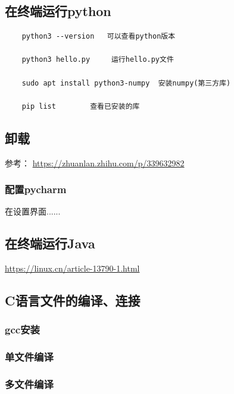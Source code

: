\documentclass[12pt]{article}
\begin{document}
\newpage
\subsection{在终端运行python}

\begin{verbatim}
    python3 --version   可以查看python版本

    python3 hello.py     运行hello.py文件

    sudo apt install python3-numpy  安装numpy(第三方库)

    pip list        查看已安装的库
\end{verbatim}


\subsection{卸载}

参考：
\href{https://zhuanlan.zhihu.com/p/339632982}{https://zhuanlan.zhihu.com/p/339632982}

\subsubsection{配置pycharm}

在设置界面......

\subsection{在终端运行Java}

\href{https://linux.cn/article-13790-1.html}{https://linux.cn/article-13790-1.html}

\subsection{C语言文件的编译、连接}

\subsubsection{gcc安装}

\subsubsection{单文件编译}

\subsubsection{多文件编译}
\end{document}
